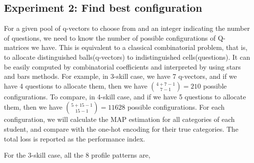 \documentclass{edm_template}
\begin{document}
\subsection{Experiment 2: Find best configuration}
For a given pool of q-vectors to choose from and an integer indicating the number of questions, we need to know the number of possible configurations of Q-matrices we have. This is equivalent to a classical combinatorial problem, that is, to allocate distinguished balls(q-vectors) to indistinguished cells(questions). It can be easily computed by combinatorial coefficients and interpreted by using stars and bars methods. For example, in 3-skill case, we have 7 q-vectors, and if we have 4 questions to allocate them, then we have ${{4+7-1}\choose {7-1}}=210$ possible configurations. To compare, in 4-skill case, and if we have 5 questions to allocate them, then we have ${{5+15-1}\choose {15-1}}=11628$ possible configurations. For each configuration, we will calculate the MAP estimation for all categories of each student, and compare with the one-hot encoding for their true categories. The total loss is reported as the performance index.


For the 3-skill case, all the 8 profile patterns are,

\end{document}
